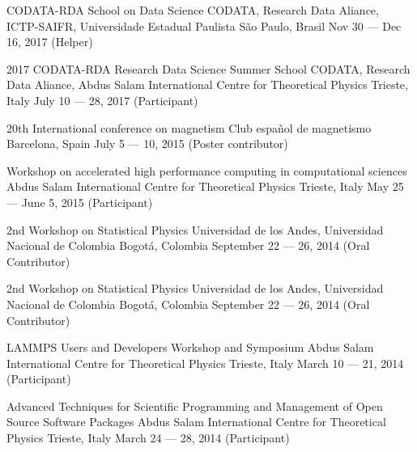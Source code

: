 \documentclass[12pt,english]{moderncv}
\begin{document}
        {CODATA-RDA School on Data Science}
        {CODATA, Research Data Aliance, ICTP-SAIFR, Universidade Estadual Paulista}
        {São Paulo, Brasil}
        {Nov 30 --- Dec 16, 2017}
        {(Helper)}

        {2017 CODATA-RDA Research Data Science Summer School}
        {CODATA, Research Data Aliance, Abdus Salam International Centre for Theoretical Physics}
        {Trieste, Italy}
        {July 10 --- 28, 2017}
        {(Participant)}

        {20th International conference on magnetism}
        {Club español de magnetismo}
        {Barcelona, Spain}
        {July 5 --- 10, 2015}
        {(Poster contributor)}

        {Workshop on accelerated high performance computing in computational sciences}
        {Abdus Salam International Centre for Theoretical Physics}
        {Trieste, Italy}
        {May 25 --- June 5, 2015}
        {(Participant)}

        {2nd Workshop on Statistical Physics}
        {Universidad de los Andes, Universidad Nacional de Colombia}
        {Bogotá, Colombia}
        {September 22 --- 26, 2014}
        {(Oral Contributor)}

        {2nd Workshop on Statistical Physics}
        {Universidad de los Andes, Universidad Nacional de Colombia}
        {Bogotá, Colombia}
        {September 22 --- 26, 2014}
        {(Oral Contributor)}

        {LAMMPS Users and Developers Workshop and Symposium}
        {Abdus Salam International Centre for Theoretical Physics}
        {Trieste, Italy}
        {March 10 --- 21, 2014}
        {(Participant)}

        {%
            Advanced Techniques for Scientific Programming and Management
            of Open Source Software Packages
        }
        {Abdus Salam International Centre for Theoretical Physics}
        {Trieste, Italy}
        {March 24 --- 28, 2014}
        {(Participant)}
\end{document}
